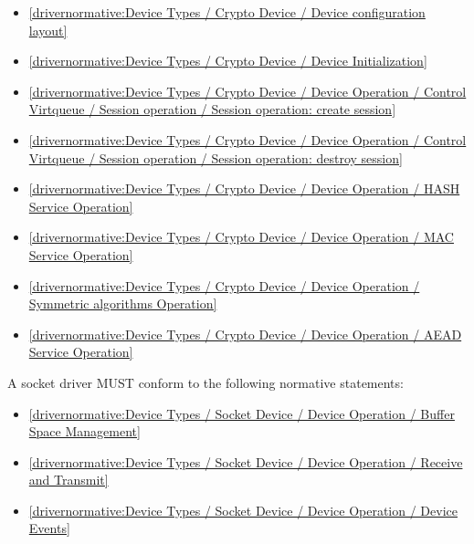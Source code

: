 \begin{itemize}
\item \ref{drivernormative:Device Types / Crypto Device / Device configuration layout}
\item \ref{drivernormative:Device Types / Crypto Device / Device Initialization}
\item \ref{drivernormative:Device Types / Crypto Device / Device Operation / Control Virtqueue / Session operation / Session operation: create session}
\item \ref{drivernormative:Device Types / Crypto Device / Device Operation / Control Virtqueue / Session operation / Session operation: destroy session}
\item \ref{drivernormative:Device Types / Crypto Device / Device Operation / HASH Service Operation}
\item \ref{drivernormative:Device Types / Crypto Device / Device Operation / MAC Service Operation}
\item \ref{drivernormative:Device Types / Crypto Device / Device Operation / Symmetric algorithms Operation}
\item \ref{drivernormative:Device Types / Crypto Device / Device Operation / AEAD Service Operation}
\end{itemize}

\label{sec:Conformance / Driver Conformance / Socket Driver Conformance}

A socket driver MUST conform to the following normative statements:

\begin{itemize}
\item \ref{drivernormative:Device Types / Socket Device / Device Operation / Buffer Space Management}
\item \ref{drivernormative:Device Types / Socket Device / Device Operation / Receive and Transmit}
\item \ref{drivernormative:Device Types / Socket Device / Device Operation / Device Events}
\end{itemize}

\label{sec:Conformance / Driver Conformance / File System Driver Conformance}

